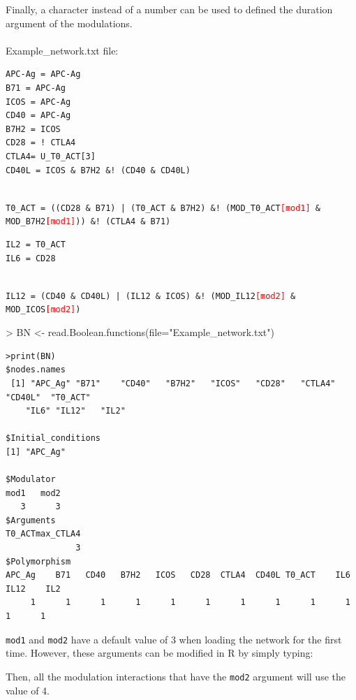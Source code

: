 \documentclass[a4paper]{article}
\begin{document}
Finally, a character instead of a number can be used to defined the duration argument of the modulations. \\ 
\\ Example\_network.txt file:
\begin{framed}
\begin{BVerbatim}
APC-Ag = APC-Ag
B71 = APC-Ag
ICOS = APC-Ag
CD40 = APC-Ag
B7H2 = ICOS
CD28 = ! CTLA4
CTLA4= U_T0_ACT[3]
CD40L = ICOS & B7H2 &! (CD40 & CD40L)
\end{BVerbatim}
\\
\texttt{T0\_ACT = ((CD28 \& B71) | (T0\_ACT \& B7H2) \&! (MOD\_T0\_ACT\textcolor{red}{[mod1]} \& MOD\_B7H2\textcolor{red}{[mod1]})) \&! (CTLA4 \& B71)}\\
\begin{BVerbatim}
IL2 = T0_ACT
IL6 = CD28
\end{BVerbatim}
\\
\texttt{IL12 = (CD40 \& CD40L) | (IL12 \& ICOS) \&! (MOD\_IL12\textcolor{red}{[mod2]} \& MOD\_ICOS\textcolor{red}{[mod2]})}

\end{framed}
\begin{Schunk}
\begin{Sinput}
> BN <- read.Boolean.functions(file="Example_network.txt")
\end{Sinput}
\end{Schunk}
\begin{verbatim}
>print(BN)
$nodes.names
 [1] "APC_Ag" "B71"    "CD40"   "B7H2"   "ICOS"   "CD28"   "CTLA4"  "CD40L"  "T0_ACT" 
    "IL6" "IL12"   "IL2"
    
$Initial_conditions
[1] "APC_Ag"

$Modulator
mod1   mod2 
   3      3 
$Arguments
T0_ACTmax_CTLA4 
              3 
$Polymorphism
APC_Ag    B71   CD40   B7H2   ICOS   CD28  CTLA4  CD40L T0_ACT    IL6   IL12    IL2 
     1      1      1      1      1      1      1      1      1      1      1      1 

\end{verbatim}

\texttt{mod1} and \texttt{mod2} have a default value of 3 when loading the network for the first time. However, these arguments can be modified in R by simply typing:
\begin{Schunk}
\end{Schunk}
Then, all the modulation interactions that have the \texttt{mod2} argument will use the value of 4.
\end{document}
